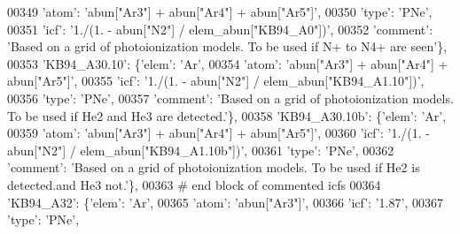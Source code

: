 \begin{DoxyCode}
00349                                      \textcolor{stringliteral}{'atom'}: \textcolor{stringliteral}{'abun["Ar3"] + abun["Ar4"] + abun["Ar5"]'},
00350                                      \textcolor{stringliteral}{'type'}: \textcolor{stringliteral}{'PNe'},
00351                                      \textcolor{stringliteral}{'icf'}: \textcolor{stringliteral}{'1./(1. - abun["N2"] / elem\_abun["KB94\_A0"])'},
00352                                       \textcolor{stringliteral}{'comment'}: \textcolor{stringliteral}{'Based on a grid of photoionization models. To be used if
       N+ to N4+ are seen'}\},
00353                          \textcolor{stringliteral}{'KB94\_A30.10'}: \{\textcolor{stringliteral}{'elem'}: \textcolor{stringliteral}{'Ar'},
00354                                      \textcolor{stringliteral}{'atom'}: \textcolor{stringliteral}{'abun["Ar3"] + abun["Ar4"] + abun["Ar5"]'},
00355                                      \textcolor{stringliteral}{'icf'}: \textcolor{stringliteral}{'1./(1. - abun["N2"] / elem\_abun["KB94\_A1.10"])'},
00356                                      \textcolor{stringliteral}{'type'}: \textcolor{stringliteral}{'PNe'},
00357                                       \textcolor{stringliteral}{'comment'}: \textcolor{stringliteral}{'Based on a grid of photoionization models. To be used if
       He2 and He3 are detected.'}\},
00358                          \textcolor{stringliteral}{'KB94\_A30.10b'}: \{\textcolor{stringliteral}{'elem'}: \textcolor{stringliteral}{'Ar'},
00359                                      \textcolor{stringliteral}{'atom'}: \textcolor{stringliteral}{'abun["Ar3"] + abun["Ar4"] + abun["Ar5"]'},
00360                                      \textcolor{stringliteral}{'icf'}: \textcolor{stringliteral}{'1./(1. - abun["N2"] / elem\_abun["KB94\_A1.10b"])'},
00361                                      \textcolor{stringliteral}{'type'}: \textcolor{stringliteral}{'PNe'},
00362                                       \textcolor{stringliteral}{'comment'}: \textcolor{stringliteral}{'Based on a grid of photoionization models. To be used if
       He2 is detected.and He3 not.'}\},
00363 \textcolor{comment}{# end block of commented icfs}
00364                          \textcolor{stringliteral}{'KB94\_A32'}: \{\textcolor{stringliteral}{'elem'}: \textcolor{stringliteral}{'Ar'},
00365                                      \textcolor{stringliteral}{'atom'}: \textcolor{stringliteral}{'abun["Ar3"]'},
00366                                      \textcolor{stringliteral}{'icf'}: \textcolor{stringliteral}{'1.87'},
00367                                      \textcolor{stringliteral}{'type'}: \textcolor{stringliteral}{'PNe'},

\end{DoxyCode}
